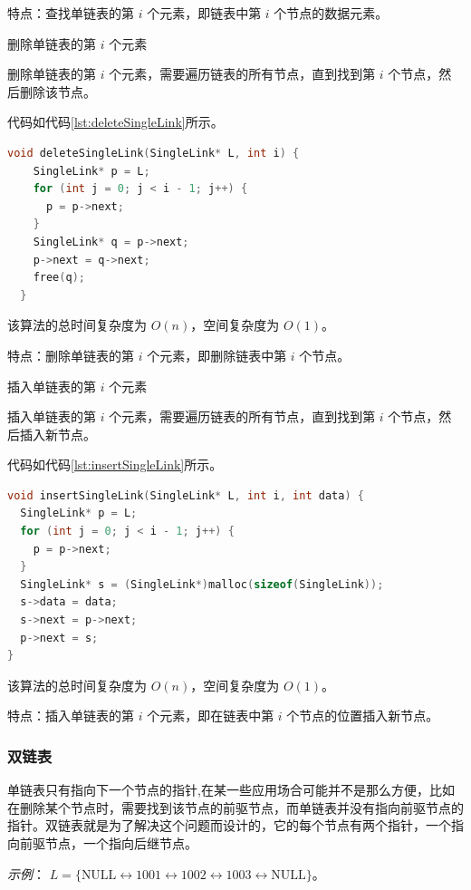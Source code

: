 \documentclass[lang=cn,newtx,10pt,scheme=chinese]{elegantbook}
\begin{document}
特点：查找单链表的第 $i$ 个元素，即链表中第 $i$ 个节点的数据元素。

删除单链表的第 $i$ 个元素

删除单链表的第 $i$ 个元素，需要遍历链表的所有节点，直到找到第 $i$ 个节点，然后删除该节点。

代码如代码\ref{lst:deleteSingleLink}所示。

\begin{lstlisting}[language=C++, caption={删除单链表的第 $i$ 个元素示例代码}, label={lst:deleteSingleLink}]
  void deleteSingleLink(SingleLink* L, int i) {
    SingleLink* p = L;
    for (int j = 0; j < i - 1; j++) {
      p = p->next;
    }
    SingleLink* q = p->next;
    p->next = q->next;
    free(q);
  }
  \end{lstlisting}
  该算法的总时间复杂度为 $O(n)$，空间复杂度为 $O(1)$。

  特点：删除单链表的第 $i$ 个元素，即删除链表中第 $i$ 个节点。

插入单链表的第 $i$ 个元素

插入单链表的第 $i$ 个元素，需要遍历链表的所有节点，直到找到第 $i$ 个节点，然后插入新节点。

代码如代码\ref{lst:insertSingleLink}所示。

\begin{lstlisting}[language=C++, caption={插入单链表的第 $i$ 个元素示例代码}, label={lst:insertSingleLink}]
void insertSingleLink(SingleLink* L, int i, int data) {
  SingleLink* p = L;
  for (int j = 0; j < i - 1; j++) {
    p = p->next;
  }
  SingleLink* s = (SingleLink*)malloc(sizeof(SingleLink));
  s->data = data;
  s->next = p->next;
  p->next = s;
}
\end{lstlisting}
该算法的总时间复杂度为 $O(n)$，空间复杂度为 $O(1)$。

特点：插入单链表的第 $i$ 个元素，即在链表中第 $i$ 个节点的位置插入新节点。
   



  \subsubsection{双链表}
  单链表只有指向下一个节点的指针,在某一些应用场合可能并不是那么方便，比如在删除某个节点时，需要找到该节点的前驱节点，而单链表并没有指向前驱节点的指针。双链表就是为了解决这个问题而设计的，它的每个节点有两个指针，一个指向前驱节点，一个指向后继节点。
  
  \textit{示例}：
  $L = \{\text{NULL} \leftrightarrow 1001 \leftrightarrow 1002 \leftrightarrow 1003 \leftrightarrow \text{NULL}\}$。
\end{document}

